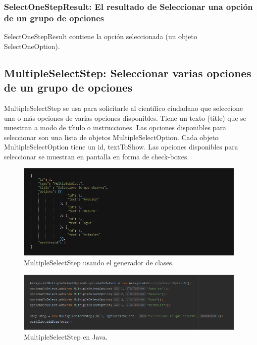 \subsubsection{SelectOneStepResult: El resultado de Seleccionar una opción de un grupo de opciones}
SelectOneStepResult contiene la opción seleccionada (un objeto SelectOneOption).





\subsection{MultipleSelectStep: Seleccionar varias opciones de un grupo de opciones}
MultipleSelectStep  se usa para solicitarle al científico ciudadano que seleccione una o más opciones de varias opciones disponibles. Tiene un texto (title) que se muestran a modo de título o instrucciones. Las opciones disponibles para seleccionar son una lista de objetos MultipleSelectOption.
Cada objeto MultipleSelectOption tiene un id, textToShow.
Las opciones disponibles para seleccionar se muestran en pantalla en forma de check-boxes.


\begin{figure}[H]
  \centering
    \includegraphics[scale=0.6]{50-anexos/C-steps/multiple_select_json.png} 
    \caption{MultipleSelectStep usando el generador de clases.}
\end{figure}	

\begin{figure}[H]
  \centering
    \includegraphics[scale=0.6]{50-anexos/C-steps/multiple_select_java.png} 
    \caption{MultipleSelectStep en Java.}
\end{figure}

